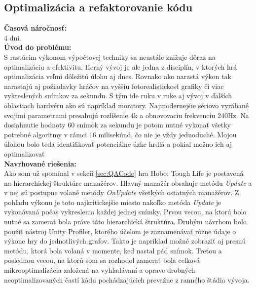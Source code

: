 \documentclass[slovak, bachelorpractice]{diploma}
\begin{document}
\subsection{Optimalizácia a refaktorovanie kódu}
\label{sec:optim}
\textbf{Časová náročnosť:} \\ 4 dni.\\
\textbf{Úvod do problému:} \\ S rastúcim výkonom výpočtovej techniky sa neustále znižuje dôraz na optimalizáciu a efektivitu. Herný vývoj je ale jedna z disciplín, v ktorých hrá optimalizácia veľmi dôležitú úlohu aj dnes. Rovnako ako narastá výkon tak narastajú aj požiadavky hráčov na vyššiu fotorealistickosť grafiky či viac vykreslených snímkov za sekundu. S tým ide ruku v ruke aj vývoj v ďalších oblastiach hardvéru ako sú napríklad monitory. Najmodernejšie sériovo vyrábané svojimi parametrami presahujú rozlíšenie 4k a obnovovaciu frekvenciu 240Hz. Na dosiahnutie hodnoty 60 snímok za sekundu je potom nutné vykonať všetky potrebné algoritmy v rámci 16 milisekúnd, čo nie je vždy jednoduché. Mojou úlohou bolo teda identifikovať potenciálne úzke hrdlá a pokiaľ možno ich aj optimalizovať \\
\textbf{Navrhované riešenia:} \\ Ako som už spomínal v sekcií \ref{sec:QACode} hra Hobo: Tough Life je postavená na hierarchickej štruktúre manažérov. Hlavný manažér obsahuje metódu \textit{Update} a v nej sú postupne volané metódy \textit{OnUpdate} všetkých ostatných manažérov. Z pohľadu výkonu je toto najkritickejšie miesto nakoľko metóda \textit{Update} je vykonávaná počas vykreslenia každej jednej snímky. Prvou vecou, na ktorú bolo nutné sa zamerať bola práve táto hierarchická štruktúra. Druhým návrhom bolo použiť nástroj Unity Profiler, ktorého účelom je zaznamenávať rôzne údaje o výkone hry do jednotlivých grafov. Takto je napríklad možné zobraziť aj presnú metódu, ktorá bola volaná v momente, keď nastal pád snímok. Treťou a poslednou vecou, na ktorú som sa rozhodol zamerať bola celková mikrooptimalizácia založená na vyhľadávaní a oprave drobných neoptimalizovaných častí kódu pochádzajúcich prevažne z ranného štádia vývoja.  \\
\end{document}
